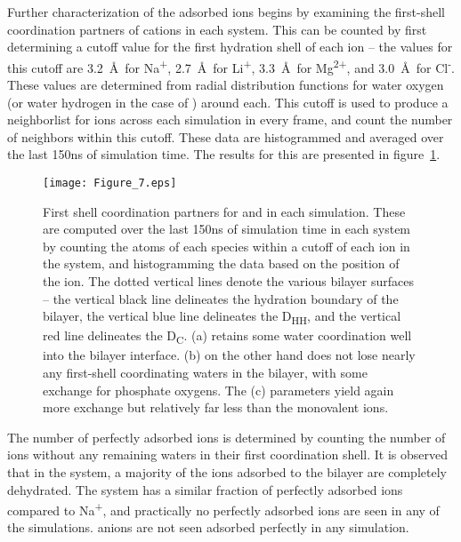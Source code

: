 Further characterization of the adsorbed ions begins by examining the first-shell coordination partners of cations in each system.
This can be counted by first determining a cutoff value for the first hydration shell of each ion 
-- the values for this cutoff are
3.2~\AA~for Na\textsuperscript{+}, 2.7~\AA~for Li\textsuperscript{+}, 3.3~\AA~for Mg\textsuperscript{2+}, 
and 3.0~\AA~for Cl\textsuperscript{-}. 
These values are determined from radial distribution 
functions for water oxygen (or water hydrogen in the case of \cl) around each. 
This cutoff is used to produce a neighborlist for ions
across each simulation in every frame, and count the number of neighbors within this cutoff. 
These data {are} histogrammed and averaged over
the last 150ns of simulation time. The results for this are presented in figure~\ref{figch3:cood}.
\begin{figure}[H]
    \caption[First shell coordinators for \li{} and \mg]{First shell coordination partners 
        for \li{} and \mg in each simulation. 
        These are computed over the last 150ns of 
        simulation time in each system by counting 
        the atoms of each species within a cutoff 
        of each ion in the system, and histogramming 
        the data based on the position of the ion. 
        The dotted vertical lines denote the various 
        bilayer surfaces -- the vertical black
        line delineates the hydration boundary of the bilayer,
        the vertical blue line delineates the D\textsubscript{HH},
        and the vertical red line delineates the D\textsubscript{C}.
        \li{} (a) retains some water 
        coordination well into the bilayer
        interface.
        \mgmbnbfix (b) on the other hand does not lose
        nearly any first-shell coordinating
        waters in the bilayer, with some exchange for phosphate
        oxygens. The \mgmicro (c) parameters yield again more exchange but 
        relatively far less than the monovalent
    ions.}
    \label{figch3:cood}
    \texttt{[image: Figure\_7.eps]}
\end{figure}

The number of perfectly adsorbed ions is determined by counting the number of ions without any remaining 
waters in their first coordination shell. It is observed that in the \na system, a 
majority of the ions adsorbed to the bilayer are completely dehydrated. %
The \li{} system has a similar fraction of perfectly adsorbed ions compared to Na\textsuperscript{+}, 
and practically no perfectly adsorbed 
ions are seen in any of the \mg simulations. \cl anions are not seen adsorbed perfectly in any simulation.

